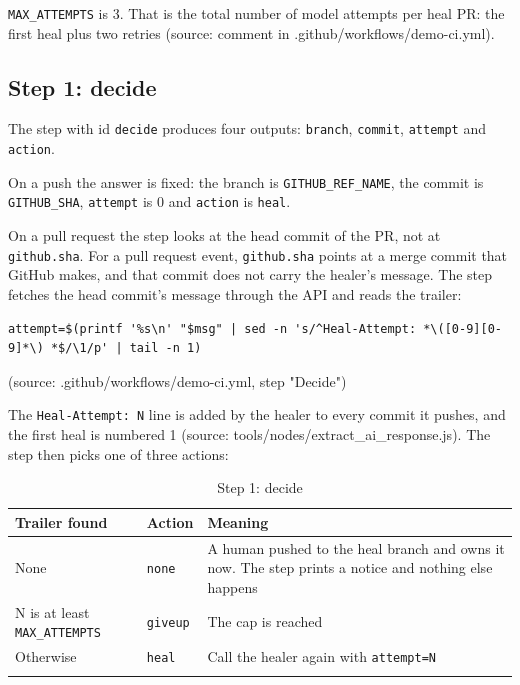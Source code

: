 \texttt{MAX\_\allowbreak{}ATTEMPTS} is 3. That is the total number of model attempts per heal PR: the first heal plus two retries (source: comment in .github/\allowbreak{}workflows/\allowbreak{}demo-ci.yml).

\subsection{Step 1: decide}

The step with id \texttt{decide} produces four outputs: \texttt{branch}, \texttt{commit}, \texttt{attempt} and \texttt{action}.

On a push the answer is fixed: the branch is \texttt{GITHUB\_\allowbreak{}REF\_\allowbreak{}NAME}, the commit is \texttt{GITHUB\_\allowbreak{}SHA}, \texttt{attempt} is 0 and \texttt{action} is \texttt{heal}.

On a pull request the step looks at the head commit of the PR, not at \texttt{github.\allowbreak{}sha}. For a pull request event, \texttt{github.\allowbreak{}sha} points at a merge commit that GitHub makes, and that commit does not carry the healer's message. The step fetches the head commit's message through the API and reads the trailer:

\begin{lstlisting}
attempt=$(printf '%s\n' "$msg" | sed -n 's/^Heal-Attempt: *\([0-9][0-9]*\) *$/\1/p' | tail -n 1)
\end{lstlisting}

(source: .github/\allowbreak{}workflows/\allowbreak{}demo-ci.yml, step "Decide")

The \texttt{Heal-\allowbreak{}Attempt:\allowbreak{} N} line is added by the healer to every commit it pushes, and the first heal is numbered 1 (source: tools/\allowbreak{}nodes/\allowbreak{}extract\_\allowbreak{}ai\_\allowbreak{}response.js). The step then picks one of three actions:

\begingroup\small
\begin{longtable}{>{\raggedright\arraybackslash}p{0.311\dimexpr\linewidth-6\tabcolsep\relax}>{\raggedright\arraybackslash}p{0.156\dimexpr\linewidth-6\tabcolsep\relax}>{\raggedright\arraybackslash}p{0.533\dimexpr\linewidth-6\tabcolsep\relax}}
\toprule
\rowcolor{gray!14}\textbf{Trailer found} & \textbf{Action} & \textbf{Meaning} \\
\midrule
\endhead
\bottomrule
\endfoot
\endlastfoot
None & \texttt{none} & A human pushed to the heal branch and owns it now. The step prints a notice and nothing else happens \\
N is at least \texttt{MAX\_\allowbreak{}ATTEMPTS} & \texttt{giveup} & The cap is reached \\
Otherwise & \texttt{heal} & Call the healer again with \texttt{attempt=N} \\
\bottomrule
\caption{Step 1: decide}\label{tab:05-1}\\
\end{longtable}
\endgroup

